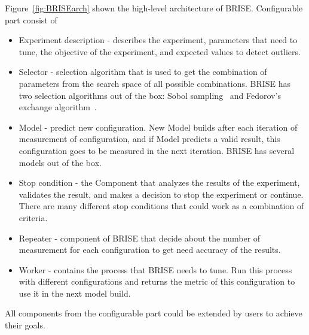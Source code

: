 Figure~\ref{fig:BRISEarch} shown the high-level architecture of BRISE.
Configurable part consist of 
\begin{itemize}
	\item Experiment description - describes the experiment, parameters that need to tune, the objective of the experiment, and expected values to detect outliers.
	\item Selector - selection algorithm that is used to get the combination of parameters from the search space of all possible combinations. BRISE has two selection algorithms out of the box: Sobol sampling~\cite{sobol99} and Fedorov's exchange algorithm~\cite{fedorov13}. 
	\item Model - predict new configuration. New Model builds after each iteration of measurement of configuration, and if Model predicts a valid result, this configuration goes to be measured in the next iteration. BRISE has several models out of the box.
	\item Stop condition - the Component that analyzes the results of the experiment, validates the result, and makes a decision to stop the experiment or continue. There are many different stop conditions that could work as a combination of criteria.
	\item Repeater - component of BRISE that decide about the number of measurement for each configuration to get need accuracy of the results. 
	\item Worker - contains the process that BRISE needs to tune. Run this process with different configurations and returns the metric of this configuration to use it in the next model build.
\end{itemize}
All components from the configurable part could be extended by users to achieve their goals.








